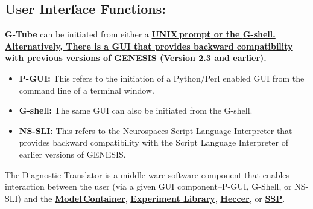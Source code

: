 \documentclass[12pt]{article}
\begin{document}
\subsection*{User Interface Functions:} {\bf G-Tube} can be initiated from either a \href{../unix-linux/unix-linux.tex}\bf {\bf UNIX\,prompt} or the \href{../gshell/gshell.tex}{\bf G-shell}. Alternatively, There is a GUI that provides backward compatibility with previous versions of GENESIS (Version 2.3 and earlier).

\begin{itemize}
   \item {\bf P-GUI:} This refers to the initiation of a Python/Perl enabled GUI from the command line of a terminal window.
   \item {\bf G-shell:} The same GUI can also be initiated from the G-shell.
   \item {\bf NS-SLI:} This refers to the Neurospaces Script Language Interpreter that provides backward compatibility with the Script Language Interpreter of earlier versions of GENESIS.
\end{itemize}

The Diagnostic Translator is a middle ware software component that enables interaction between the user (via a given GUI component--P-GUI, G-Shell, or NS-SLI) and the \href{../model-container/model-container.tex}{\bf Model\,Container}, \href{../experiment/experiment.tex}{\bf Experiment Library}, \href{../heccer/heccer.tex}{\bf Heccer}, or \href{../ssp/ssp.tex}{\bf SSP}.
\end{document}
